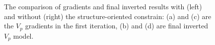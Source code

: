 \begin{figure}[!htb]
   \centering
   \\
   \\
   \caption{The comparison of gradients and final inverted results with (left) and
   without (right) 
   the structure-oriented constrain: (a) and (c) are the $V_p$ gradients in the first
   iteration, (b) and (d) are final inverted $V_p$ model.}
   \label{fig:LSF_comparison}
\end{figure}

